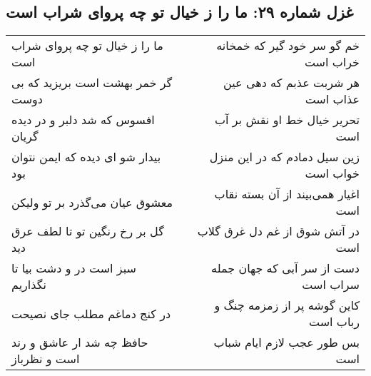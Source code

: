 \begin{center}
\section*{غزل شماره ۲۹: ما را ز خیال تو چه پروای شراب است}
\label{sec:sh029}
\begin{longtable}{l p{0.5cm} r}
ما را ز خیال تو چه پروای شراب است
&&
خم گو سر خود گیر که خمخانه خراب است
\\
گر خمر بهشت است بریزید که بی دوست
&&
هر شربت عذبم که دهی عین عذاب است
\\
افسوس که شد دلبر و در دیده گریان
&&
تحریر خیال خط او نقش بر آب است
\\
بیدار شو ای دیده که ایمن نتوان بود
&&
زین سیل دمادم که در این منزل خواب است
\\
معشوق عیان می‌گذرد بر تو ولیکن
&&
اغیار همی‌بیند از آن بسته نقاب است
\\
گل بر رخ رنگین تو تا لطف عرق دید
&&
در آتش شوق از غم دل غرق گلاب است
\\
سبز است در و دشت بیا تا نگذاریم
&&
دست از سر آبی که جهان جمله سراب است
\\
در کنج دماغم مطلب جای نصیحت
&&
کاین گوشه پر از زمزمه چنگ و رباب است
\\
حافظ چه شد ار عاشق و رند است و نظرباز
&&
بس طور عجب لازم ایام شباب است
\\
\end{longtable}
\end{center}
